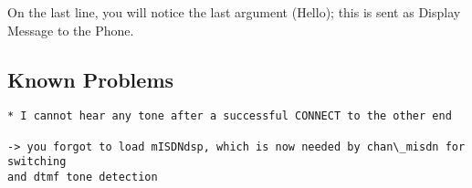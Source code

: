 On the last line, you will notice the last argument (Hello); this is sent
as Display Message to the Phone.

\subsection{Known Problems}

\begin{verbatim}
* I cannot hear any tone after a successful CONNECT to the other end

-> you forgot to load mISDNdsp, which is now needed by chan\_misdn for switching
and dtmf tone detection
\end{verbatim}
